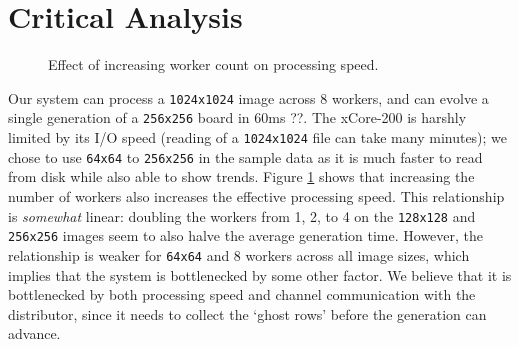\documentclass{article}
\begin{document}
    \section{Critical Analysis}
    
    \begin{figure}
        \begin{center}
            
            \hspace{1cm}
            
        \end{center}
        \vspace{-2mm}
        \caption{Effect of increasing worker count on processing speed.}
        \label{fig:workers}
    \end{figure}

    Our system can process a \verb|1024x1024| image across 8 workers, and can evolve a single generation of a \verb|256x256| board in 60ms ??. The xCore-200 is harshly limited by its I/O speed (reading of a \verb|1024x1024| file can take many minutes); we chose to use \verb|64x64| to \verb|256x256| in the sample data as it is much faster to read from disk while also able to show trends. Figure \ref{fig:workers} shows that increasing the number of workers also increases the effective processing speed. This relationship is \textit{somewhat} linear: doubling the workers from 1, 2, to 4 on the \verb|128x128| and \verb|256x256| images seem to also halve the average generation time. However, the relationship is weaker for \verb|64x64| and 8 workers across all image sizes, which implies that the system is bottlenecked by some other factor. We believe that it is bottlenecked by both processing speed and channel communication with the distributor, since it needs to collect the `ghost rows' before the generation can advance. \\
\end{document}
